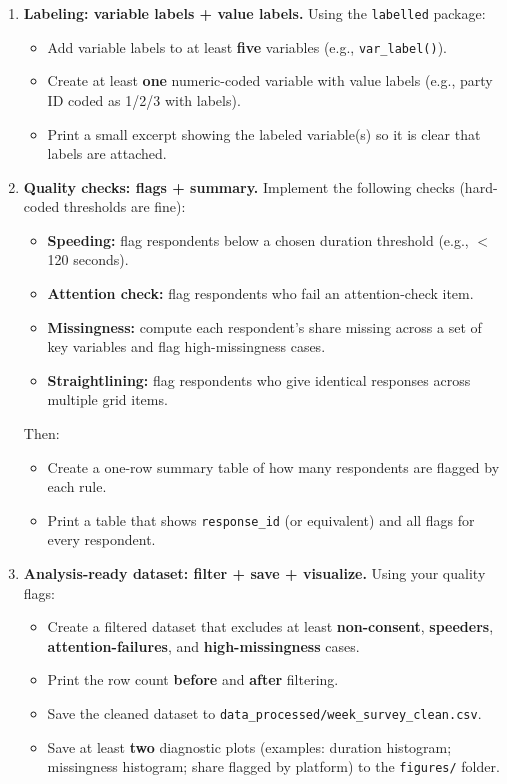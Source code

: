\documentclass[11pt]{article}
\begin{document}
\begin{enumerate}
\item \textbf{Labeling: variable labels + value labels.}
Using the \texttt{labelled} package:
\begin{itemize}
  \item Add variable labels to at least \textbf{five} variables (e.g., \texttt{var\_label()}).
  \item Create at least \textbf{one} numeric-coded variable with value labels (e.g., party ID coded as 1/2/3 with labels).
  \item Print a small excerpt showing the labeled variable(s) so it is clear that labels are attached.
\end{itemize}

\item \textbf{Quality checks: flags + summary.}
Implement the following checks (hard-coded thresholds are fine):
\begin{itemize}
  \item \textbf{Speeding:} flag respondents below a chosen duration threshold (e.g., $<$ 120 seconds).
  \item \textbf{Attention check:} flag respondents who fail an attention-check item.
  \item \textbf{Missingness:} compute each respondent's share missing across a set of key variables and flag high-missingness cases.
  \item \textbf{Straightlining:} flag respondents who give identical responses across multiple grid items.
\end{itemize}
Then:
\begin{itemize}
  \item Create a one-row summary table of how many respondents are flagged by each rule.
  \item Print a table that shows \texttt{response\_id} (or equivalent) and all flags for every respondent.
\end{itemize}

\item \textbf{Analysis-ready dataset: filter + save + visualize.}
Using your quality flags:
\begin{itemize}
  \item Create a filtered dataset that excludes at least \textbf{non-consent}, \textbf{speeders}, \textbf{attention-failures}, and \textbf{high-missingness} cases.
  \item Print the row count \textbf{before} and \textbf{after} filtering.
  \item Save the cleaned dataset to \texttt{data\_processed/week\_survey\_clean.csv}.
  \item Save at least \textbf{two} diagnostic plots (examples: duration histogram; missingness histogram; share flagged by platform) to the \texttt{figures/} folder.
\end{itemize}


\end{enumerate}
\end{document}
